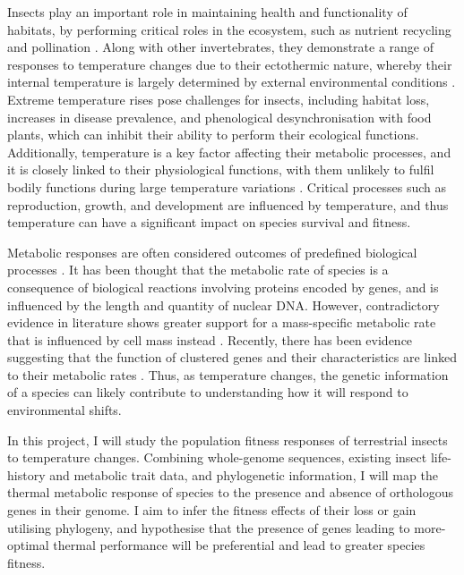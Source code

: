 \documentclass[11pt]{article}
\begin{document}
Insects play an important role in maintaining health and functionality of habitats, by performing critical roles in the ecosystem, such as nutrient recycling and pollination \citep{Belovsky2000Insect}. Along with other invertebrates, they demonstrate a range of responses to temperature changes due to their ectothermic nature, whereby their internal temperature is largely determined by external environmental conditions \citep{Vanbergen2013Threats}. Extreme temperature rises pose challenges for insects, including habitat loss, increases in disease prevalence, and phenological desynchronisation with food plants, which can inhibit their ability to perform their ecological functions. Additionally, temperature is a key factor affecting their metabolic processes, and it is closely linked to their physiological functions, with them unlikely to fulfil bodily functions during large temperature variations \citep{Dukes2009Responses}. Critical processes such as reproduction, growth, and development are influenced by temperature, and thus temperature can have a significant impact on species survival and fitness.  

Metabolic responses are often considered outcomes of predefined biological processes \citep{gillooly2001effects}. It has been thought that the metabolic rate of species is a consequence of biological reactions involving proteins encoded by genes, and is influenced by the length and quantity of nuclear DNA. However, contradictory evidence in literature shows greater support for a mass-specific metabolic rate that is influenced by cell mass instead \citep{Starostova2009Cell}. Recently, there has been evidence suggesting that the function of clustered genes and their characteristics are linked to their metabolic rates \citep{Takemoto2015Proportion}. Thus, as temperature changes, the genetic information of a species can likely contribute to understanding how it will respond to environmental shifts. 

In this project, I will study the population fitness responses of terrestrial insects to temperature changes. Combining whole-genome sequences, existing insect life-history and metabolic trait data, and phylogenetic information, I will map the thermal metabolic response of species to the presence and absence of orthologous genes in their genome. I aim to infer the fitness effects of their loss or gain utilising phylogeny, and hypothesise that the presence of genes leading to more-optimal thermal performance will be preferential and lead to greater species fitness.
\end{document}
